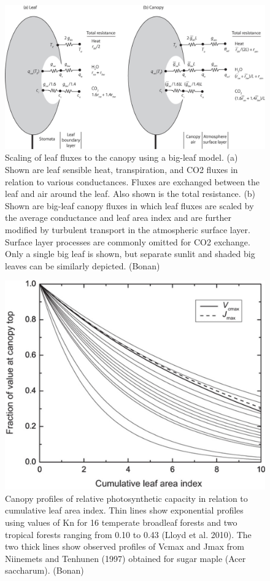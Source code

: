 \documentclass[12pt,oneside]{book}
\begin{document}
\begin{figure}

{\centering \includegraphics[width=0.8\linewidth]{figures/chap3/f323_bigleaf} 

}

\caption{Scaling of leaf fluxes to the canopy using a big-leaf model. (a) Shown are leaf sensible heat, transpiration, and CO2 fluxes in relation to various conductances. Fluxes are exchanged between the leaf and air around the leaf. Also shown is the total resistance. (b) Shown are big-leaf canopy fluxes in which leaf fluxes are scaled by the average conductance and leaf area index and are further modified by turbulent transport in the atmospheric surface layer. Surface layer processes are commonly omitted for CO2 exchange. Only a single big leaf is shown, but separate sunlit and shaded big leaves can be similarly depicted. (Bonan)}\label{fig:f323}
\end{figure}

\begin{figure}

{\centering \includegraphics[width=0.8\linewidth]{figures/chap3/f324_vcamx_profile} 

}

\caption{Canopy profiles of relative photosynthetic capacity in relation to cumulative leaf area index. Thin lines show exponential profiles using values of Kn for 16 temperate broadleaf forests and two tropical forests ranging from 0.10 to 0.43 (Lloyd et al. 2010). The two thick lines show observed profiles of Vcmax and Jmax from Niinemets and Tenhunen (1997) obtained for sugar maple (Acer saccharum). (Bonan)}\label{fig:f324}
\end{figure}
\end{document}
